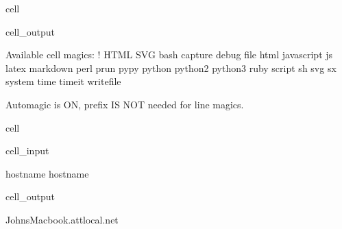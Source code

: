 \documentclass[letterpaper,10pt,english]{jupyterBook}
\begin{document}
\begin{sphinxuseclass}{cell}
\begin{sphinxVerbatimOutput}
\begin{sphinxuseclass}{cell_output}
\begin{sphinxVerbatim}[commandchars=\\\{\}]
Available cell magics:
\PYGZpc{}\PYGZpc{}!  \PYGZpc{}\PYGZpc{}HTML  \PYGZpc{}\PYGZpc{}SVG  \PYGZpc{}\PYGZpc{}bash  \PYGZpc{}\PYGZpc{}capture  \PYGZpc{}\PYGZpc{}debug  \PYGZpc{}\PYGZpc{}file  \PYGZpc{}\PYGZpc{}html  \PYGZpc{}\PYGZpc{}javascript  \PYGZpc{}\PYGZpc{}js  \PYGZpc{}\PYGZpc{}latex  \PYGZpc{}\PYGZpc{}markdown  \PYGZpc{}\PYGZpc{}perl  \PYGZpc{}\PYGZpc{}prun  \PYGZpc{}\PYGZpc{}pypy  \PYGZpc{}\PYGZpc{}python  \PYGZpc{}\PYGZpc{}python2  \PYGZpc{}\PYGZpc{}python3  \PYGZpc{}\PYGZpc{}ruby  \PYGZpc{}\PYGZpc{}script  \PYGZpc{}\PYGZpc{}sh  \PYGZpc{}\PYGZpc{}svg  \PYGZpc{}\PYGZpc{}sx  \PYGZpc{}\PYGZpc{}system  \PYGZpc{}\PYGZpc{}time  \PYGZpc{}\PYGZpc{}timeit  \PYGZpc{}\PYGZpc{}writefile

Automagic is ON, \PYGZpc{} prefix IS NOT needed for line magics.
\end{sphinxVerbatim}

\end{sphinxuseclass}\end{sphinxVerbatimOutput}

\end{sphinxuseclass}
\begin{sphinxuseclass}{cell}\begin{sphinxVerbatimInput}

\begin{sphinxuseclass}{cell_input}
\begin{sphinxVerbatim}[commandchars=\\\{\}]
hostname
  hostname
\end{sphinxVerbatim}

\end{sphinxuseclass}\end{sphinxVerbatimInput}
\begin{sphinxVerbatimOutput}

\begin{sphinxuseclass}{cell_output}
\begin{sphinxVerbatim}[commandchars=\\\{\}]
Johns\PYGZhy{}Macbook.attlocal.net
\end{sphinxVerbatim}

\begin{sphinxVerbatim}
\end{sphinxVerbatim}

\end{sphinxuseclass}\end{sphinxVerbatimOutput}

\end{sphinxuseclass}
\begin{DUlineblock}{0em}
\item[] 
\end{DUlineblock}
\end{document}
